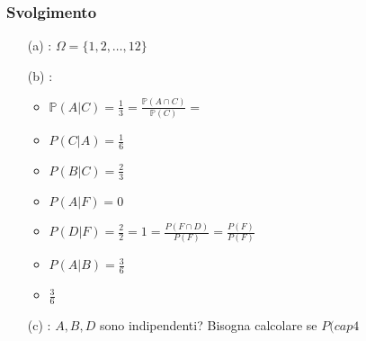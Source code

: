 \subsubsection{Svolgimento}
\begin{itemize}
  \item[(a)]: $\Omega =\{1,2,\dots, 12\}$
  \item[(b)]: 
  \begin{itemize}
    \item $\mathbb{P}(A|C) = \frac{1}{3}=\frac{\mathbb{P}(A\cap C)}{\mathbb{P}(C)}=$ 
    \item $P(C|A)= \frac{1}{6}$
    \item $P(B|C) = \frac{2}{3}$
    \item $P(A|F) = 0$
    \item $P(D|F) = \frac{2}{2}=1=\frac{P(F\cap D)}{P(F)} = \frac{P(F)}{P(F)}$
    \item $P(A|B) = \frac{3}{6}$
    \item $\frac{3}{6}$
  \end{itemize}
  
  \item[(c)]: $A,B,D$ sono indipendenti? Bisogna calcolare se $P(cap4$ 
\end{itemize}